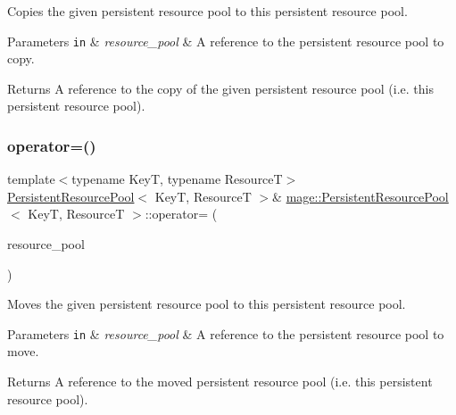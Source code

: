Copies the given persistent resource pool to this persistent resource pool.


\begin{DoxyParams}[1]{Parameters}
\mbox{\tt in}  & {\em resource\+\_\+pool} & A reference to the persistent resource pool to copy. \\
\hline
\end{DoxyParams}
\begin{DoxyReturn}{Returns}
A reference to the copy of the given persistent resource pool (i.\+e. this persistent resource pool). 
\end{DoxyReturn}
\hypertarget{classmage_1_1_persistent_resource_pool_a7c83ee99233b8fc91d005c6edf6d729e}{}\label{classmage_1_1_persistent_resource_pool_a7c83ee99233b8fc91d005c6edf6d729e} 
\subsubsection{\texorpdfstring{operator=()}{operator=()}\hspace{0.1cm}{\footnotesize\ttfamily [2/2]}}
{\footnotesize\ttfamily template$<$typename KeyT, typename ResourceT$>$ \\
\hyperlink{classmage_1_1_persistent_resource_pool}{Persistent\+Resource\+Pool}$<$ KeyT, ResourceT $>$\& \hyperlink{classmage_1_1_persistent_resource_pool}{mage\+::\+Persistent\+Resource\+Pool}$<$ KeyT, ResourceT $>$\+::operator= (\begin{DoxyParamCaption}\item[{\hyperlink{classmage_1_1_persistent_resource_pool}{Persistent\+Resource\+Pool}$<$ KeyT, ResourceT $>$ \&\&}]{resource\+\_\+pool }\end{DoxyParamCaption})\hspace{0.3cm}{\ttfamily [delete]}}

Moves the given persistent resource pool to this persistent resource pool.


\begin{DoxyParams}[1]{Parameters}
\mbox{\tt in}  & {\em resource\+\_\+pool} & A reference to the persistent resource pool to move. \\
\hline
\end{DoxyParams}
\begin{DoxyReturn}{Returns}
A reference to the moved persistent resource pool (i.\+e. this persistent resource pool). 
\end{DoxyReturn}
\hypertarget{classmage_1_1_persistent_resource_pool_ae8b7a0b7d2f6adefc725d08367b8a29f}{}\label{classmage_1_1_persistent_resource_pool_ae8b7a0b7d2f6adefc725d08367b8a29f} 
